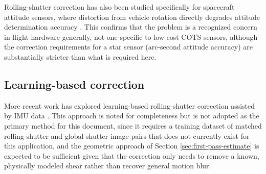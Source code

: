 Rolling-shutter correction has also been studied specifically for spacecraft attitude sensors, where distortion from vehicle rotation directly degrades attitude determination accuracy \cite{starsensor2023rollingshutter}. This confirms that the problem is a recognized concern in flight hardware generally, not one specific to low-cost COTS sensors, although the correction requirements for a star sensor (arc-second attitude accuracy) are substantially stricter than what is required here. 

\subsection{Learning-based correction}

More recent work has explored learning-based rolling-shutter correction assisted by IMU data \cite{mo2021imurollingshutter}. This approach is noted for completeness but is not adopted as the primary method for this document, since it requires a training dataset of matched rolling-shutter and global-shutter image pairs that does not currently exist for this application, and the geometric approach of Section \ref{sec:first-pass-estimate} is expected to be sufficient given that the correction only needs to remove a known, physically modeled shear rather than recover general motion blur.

